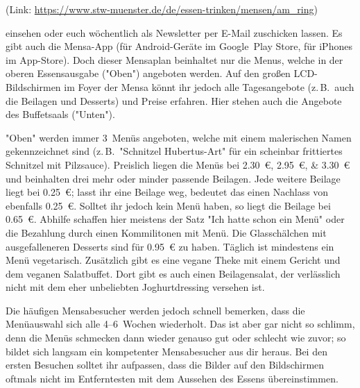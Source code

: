 \begin{multicols*}{2}
(Link: \url{https://www.stw-muenster.de/de/essen-trinken/mensen/am_ring})

einsehen oder euch wöchentlich als Newsletter per E-Mail zuschicken lassen.
Es gibt auch die Mensa-App (für Android-Geräte im Google~Play Store, für iPhones im App-Store).
Doch dieser Mensaplan beinhaltet nur die Menus, welche in der oberen Essensausgabe ("Oben") angeboten werden.
Auf den großen LCD-Bildschirmen im Foyer der Mensa könnt ihr jedoch alle Tagesangebote (z.\,B.\ auch die Beilagen und Desserts) und Preise erfahren.
Hier stehen auch die Angebote des Buffetsaals ("Unten").

"Oben" werden immer 3~Menüs angeboten, welche mit einem malerischen Namen gekennzeichnet sind (z.\,B.\ "Schnitzel Hubertus-Art" für ein scheinbar frittiertes Schnitzel mit Pilzsauce).
Preislich liegen die Menüs bei \SIlist{2,30; 2,95; 3,30}{\euro} und beinhalten drei mehr oder minder passende Beilagen.
Jede weitere Beilage liegt bei \SI{0,25}{\euro}; lasst ihr eine Beilage weg, bedeutet das einen Nachlass von ebenfalls \SI{0,25}{\euro}.
Solltet ihr jedoch kein Menü haben, so liegt die Beilage bei \SI{0,65}{\euro}.
Abhilfe schaffen hier meistens der Satz "Ich hatte schon ein Menü" oder die Bezahlung durch einen Kommilitonen mit Menü.
Die Glasschälchen mit ausgefalleneren Desserts sind für \SI{0,95}{\euro} zu haben.
Täglich ist mindestens ein Menü vegetarisch.
Zusätzlich gibt es eine vegane Theke mit einem Gericht und dem veganen Salatbuffet.
Dort gibt es auch einen Beilagensalat, der verlässlich nicht mit dem eher unbeliebten Joghurtdressing versehen ist.

Die häufigen Mensabesucher werden jedoch schnell bemerken, dass die Menüauswahl sich alle 4--6~Wochen wiederholt.
Das ist aber gar nicht so schlimm, denn die Menüs schmecken dann wieder genauso gut oder schlecht wie zuvor; so bildet sich langsam ein kompetenter Mensabesucher aus dir heraus.
Bei den ersten Besuchen solltet ihr aufpassen, dass die Bilder auf den Bildschirmen oftmals nicht im Entferntesten mit dem Aussehen des Essens übereinstimmen.


\end{multicols*}
